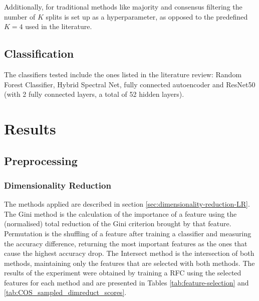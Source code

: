\documentclass[12pt, english, openany]{book}
\begin{document}
Additionally, for traditional methods like majority and consensus filtering the
number of $K$ splits is set up as a hyperparameter, as
opposed to the predefined $K=4$ used in the literature.

\section{Classification}

The classifiers tested include the ones listed in the literature review: Random
Forest Classifier, Hybrid Spectral Net, fully connected autoencoder and
ResNet50 (with 2 fully connected layers, a total of 52 hidden layers).

\chapter{Results}

\section{Preprocessing}

\subsection{Dimensionality Reduction}

The methods applied are described in section \ref{sec:dimensionality-reduction-LR}. The Gini
method is the calculation of the importance of a feature using the (normalised)
total reduction of the Gini criterion brought by that feature. Permutation is
the shuffling of a feature after training a classifier and measuring the
accuracy difference, returning the most important features as the ones that
cause the highest accuracy drop. The Intersect method is the intersection of
both methods, maintaining only the features that are selected with both
methods. The results of the experiment were obtained by training a RFC using
the selected features for each method and are presented in Tables
\ref{tab:feature-selection} and \ref{tab:COS_sampled_dimreduct_scores}.

\end{document}
